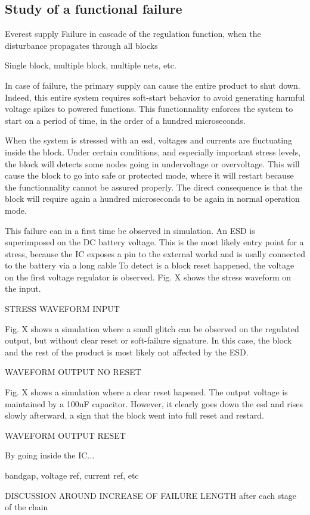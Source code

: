 \subsection{Study of a functional failure}
Everest supply
Failure in cascade of the regulation function, when the disturbance propagates through all blocks

Single block, multiple block, multiple nets, etc.

In case of failure, the primary supply can cause the entire product to shut down.
Indeed, this entire system requires soft-start behavior to avoid generating harmful voltage spikes to powered functions.
This functionnality enforces the system to start on a  period of time, in the order of a hundred microseconds.

When the system is stressed with an \gls{esd}, voltages and currents are fluctuating inside the block.
Under certain conditions, and especially important stress levels, the block will detects some nodes going in undervoltage or overvoltage.
This will cause the block to go into safe or protected mode, where it will restart because the functionnality cannot be assured properly.
The direct consequence is that the block will require again a hundred microseconds to be again in normal operation mode.

This failure can in a first time be observed in simulation.
An \gls{ESD} is superimposed on the DC battery voltage.
This is the most likely entry point for a stress, because the \gls{IC} exposes a pin to the external workd and is usally connected to the battery via a long cable
To detect is a block reset happened, the voltage on the first voltage regulator is observed.
Fig. X shows the stress waveform on the input.

STRESS WAVEFORM INPUT

Fig. X shows a simulation where a small glitch can be observed on the regulated output, but without clear reset or soft-failure signature.
In this case, the block and the rest of the product is most likely not affected by the ESD.

WAVEFORM OUTPUT NO RESET

Fig. X shows a simulation where a clear reset hapened.
The output voltage is maintained by a 100nF capacitor.
However, it clearly goes down  the \gls{esd} and rises slowly afterward, a sign that the block went into full reset and restard.

WAVEFORM OUTPUT RESET

By going inside the \gls{IC}...

bandgap, voltage ref, current ref, etc

DISCUSSION AROUND INCREASE OF FAILURE LENGTH after each stage of the chain
